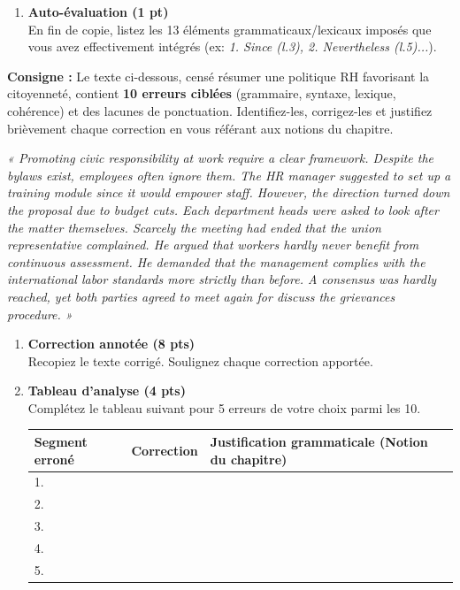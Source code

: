 \documentclass[11pt]{article}
\begin{document}
\begin{exercice}
\begin{enumerate}
    \item \textbf{Auto-évaluation (1 pt)} \\
    En fin de copie, listez les 13 éléments grammaticaux/lexicaux imposés que vous avez effectivement intégrés (ex: \textit{1. Since (l.3), 2. Nevertheless (l.5)...}).
\end{enumerate}
\end{exercice}

\begin{exercice}
\textbf{Consigne :} Le texte ci-dessous, censé résumer une politique RH favorisant la citoyenneté, contient \textbf{10 erreurs ciblées} (grammaire, syntaxe, lexique, cohérence) et des lacunes de ponctuation. Identifiez-les, corrigez-les et justifiez brièvement chaque correction en vous référant aux notions du chapitre.

\textit{« Promoting civic responsibility at work require a clear framework. Despite the bylaws exist, employees often ignore them. The HR manager suggested to set up a training module since it would empower staff. However, the direction turned down the proposal due to budget cuts. Each department heads were asked to look after the matter themselves. Scarcely the meeting had ended that the union representative complained. He argued that workers hardly never benefit from continuous assessment. He demanded that the management complies with the international labor standards more strictly than before. A consensus was hardly reached, yet both parties agreed to meet again for discuss the grievances procedure. »}

\begin{enumerate}
    \item \textbf{Correction annotée (8 pts)} \\
    Recopiez le texte corrigé. Soulignez chaque correction apportée.
    \item \textbf{Tableau d'analyse (4 pts)} \\
    Complétez le tableau suivant pour 5 erreurs de votre choix parmi les 10.

    \begin{tabular}{|p{2.5cm}|p{3.5cm}|p{4.5cm}|}
    \hline
    \textbf{Segment erroné} & \textbf{Correction} & \textbf{Justification grammaticale (Notion du chapitre)} \\
    \hline
    1. & & \\
    \hline
    2. & & \\
    \hline
    3. & & \\
    \hline
    4. & & \\
    \hline
    5. & & \\
    \hline
    \end{tabular}
\end{enumerate}
\end{exercice}
\end{document}

